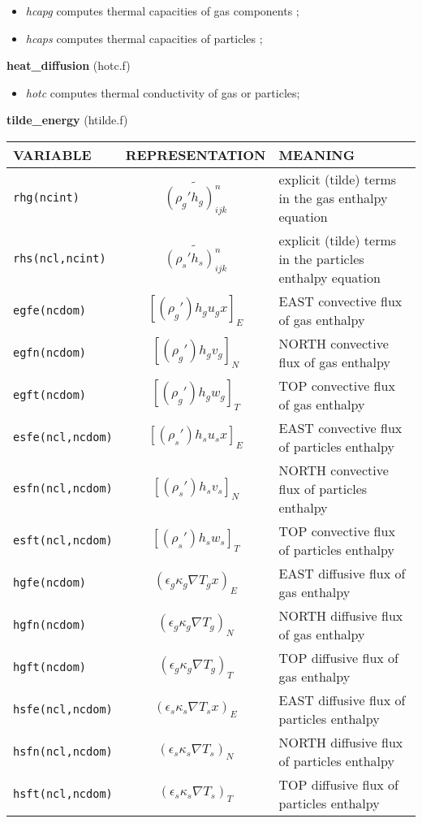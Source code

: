 \begin{itemize}
\item{\em hcapg} computes thermal capacities of gas components ;
\item{\em hcaps} computes thermal capacities of particles ;
\end{itemize}
%
%
{\large{\bf heat\_diffusion}} (hotc.f)\\
\begin{itemize}
\item{\em hotc} computes thermal conductivity of gas or particles;
\end{itemize}
%
%
{\large {\bf tilde\_energy}} (htilde.f)\\[5mm]
\begin{tabular}{|p{6cm}|c|p{6cm}|}\hline
VARIABLE & REPRESENTATION & MEANING\\\hline
\tt rhg(ncint) & $\widetilde{(\rho_g'h_g)_{ijk}^n}$ & explicit (tilde) terms in the gas enthalpy equation\\\hline
\tt rhs(ncl,ncint)& $\widetilde{(\rho_s' h_s)_{ijk}^n}$ & explicit (tilde) terms in the particles enthalpy equation\\\hline
\tt egfe(ncdom) & $\left[ (\rho_g')h_g u_g x \right]_{E}$ &EAST convective flux of gas enthalpy\\\hline
\tt egfn(ncdom) & $\left[ (\rho_g')h_g v_g \right]_{N}$ &NORTH convective flux of gas enthalpy\\\hline
\tt egft(ncdom) & $\left[ (\rho_g')h_g w_g \right]_{T}$ &TOP convective flux of gas enthalpy\\\hline
\tt esfe(ncl,ncdom)& $\left[ (\rho_s')h_su_s x\right]_{E}$ &EAST convective flux of particles enthalpy\\\hline
\tt esfn(ncl,ncdom)& $\left[ (\rho_s')h_sv_s \right]_{N}$ &NORTH convective flux of particles enthalpy\\\hline
\tt esft(ncl,ncdom)& $\left[ (\rho_s')h_sw_s \right]_{T}$ &TOP convective flux of particles enthalpy\\\hline
\tt hgfe(ncdom)&$ (\epsilon_g \kappa_g \nabla T_gx)_{E}$ &EAST diffusive flux of gas enthalpy\\\hline
\tt hgfn(ncdom)&$ (\epsilon_g \kappa_g \nabla T_g)_{N}$ &NORTH diffusive flux of gas enthalpy\\\hline
\tt hgft(ncdom)&$ (\epsilon_g \kappa_g \nabla T_g)_{T}$ &TOP diffusive flux of gas enthalpy\\\hline
\tt hsfe(ncl,ncdom)&$ (\epsilon_s \kappa_s \nabla T_sx)_{E}$ &EAST diffusive flux of particles enthalpy\\\hline
\tt hsfn(ncl,ncdom)&$ (\epsilon_s \kappa_s \nabla T_s)_{N}$ &NORTH diffusive flux of particles enthalpy\\\hline
\tt hsft(ncl,ncdom)&$ (\epsilon_s \kappa_s \nabla T_s)_{T}$ &TOP diffusive flux of particles enthalpy\\\hline
\end{tabular}\\
